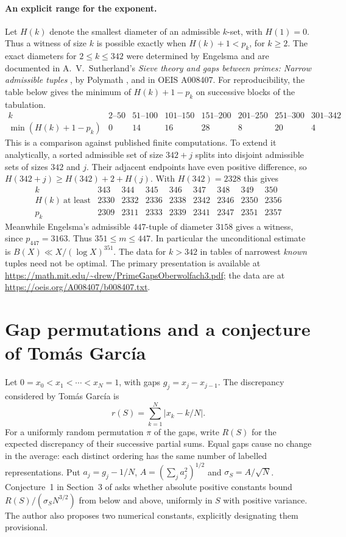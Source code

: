 \documentclass[11pt,a4paper]{article}
\begin{document}
\paragraph{An explicit range for the exponent.}
Let $H(k)$ denote the smallest diameter of an admissible $k$-set,
with $H(1)=0$. Thus a witness of size $k$ is possible exactly when
$H(k)+1<p_k$, for $k\ge2$. The exact diameters for $2\le k\le342$
were determined by Engelsma and are documented in
A.~V.~Sutherland's \emph{Sieve theory and gaps between primes:
Narrow admissible tuples} \cite{suth}, by Polymath \cite[Section 7]{poly}, and in OEIS A008407.
For reproducibility, the table below gives the minimum of
$H(k)+1-p_k$ on successive blocks of the tabulation.
\[
\begin{array}{c|rrrrrrr}
k&2\text{--}50&51\text{--}100&101\text{--}150&151\text{--}200&
201\text{--}250&251\text{--}300&301\text{--}342\\
\hline
\min(H(k)+1-p_k)&0&14&16&28&8&20&4
\end{array}
\]
This is a comparison against published finite computations. To
extend it analytically, a sorted admissible set of size $342+j$
splits into disjoint admissible sets of sizes $342$ and $j$.
Their adjacent endpoints have even positive difference, so
$H(342+j)\ge H(342)+2+H(j)$. With $H(342)=2328$ this gives
\[
\begin{array}{c|rrrrrrrr}
k&343&344&345&346&347&348&349&350\\ \hline
H(k)\ \text{at least}&2330&2332&2336&2338&2342&2346&2350&2356\\
p_k&2309&2311&2333&2339&2341&2347&2351&2357
\end{array}
\]
Meanwhile Engelsma's admissible $447$-tuple of diameter $3158$
gives a witness, since $p_{447}=3163$. Thus
$351\le{m}\le447$. In particular the unconditional estimate is
$B(X)\ll X/(\log X)^{351}$. The data for $k>342$ in tables of
narrowest \emph{known} tuples need not be optimal.
The primary presentation is available at
\url{https://math.mit.edu/~drew/PrimeGapsOberwolfach3.pdf};
the data are at \url{https://oeis.org/A008407/b008407.txt}.

\section{Gap permutations and a conjecture of Tom\'as Garc\'ia}
\label{sec:fareygaps}
Let $0=x_0<x_1<\cdots<x_N=1$, with gaps $g_j=x_j-x_{j-1}$.
The discrepancy considered by Tom\'as Garc\'ia is
\[
 r(S)=\sum_{k=1}^N|x_k-k/N|.
\]
For a uniformly random permutation $\pi$ of the gaps, write $R(S)$
for the expected discrepancy of their successive partial sums. Equal
gaps cause no change in the average: each distinct ordering has the
same number of labelled representations. Put $a_j=g_j-1/N$,
$A=(\sum_j a_j^2)^{1/2}$ and $\sigma_S=A/\sqrt N$.
Conjecture~1 in Section~3 of \cite{tg} asks whether absolute positive
constants bound $R(S)/(\sigma_S N^{3/2})$ from below and above,
uniformly in $S$ with positive variance. The author also proposes two
numerical constants, explicitly designating them provisional.
\end{document}
